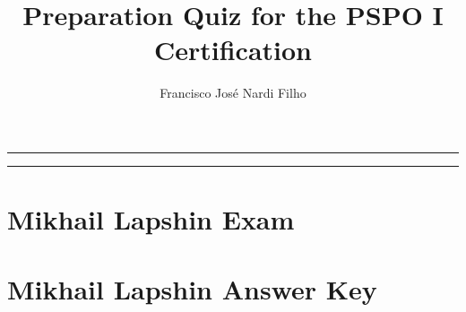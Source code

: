 \documentclass[a4paper,11pt]{article}
\begin{document}
\title{\bf{Preparation Quiz for the PSPO I Certification}}
\author{Francisco Jos\'e Nardi Filho}
\date{}
\maketitle

\hrule
\tableofcontents
\vspace{0.5cm}
\hrule

\section{Mikhail Lapshin Exam}

\newpage
\section{Mikhail Lapshin Answer Key}

\end{document}

